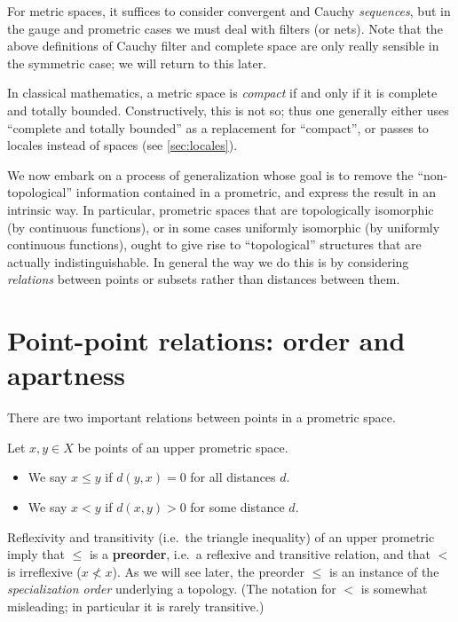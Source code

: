 \documentclass{article}
\begin{document}
For metric spaces, it suffices to consider convergent and Cauchy \emph{sequences}, but in the gauge and prometric cases we must deal with filters (or nets).
Note that the above definitions of Cauchy filter and complete space are only really sensible in the symmetric case; we will return to this later.

In classical mathematics, a metric space is \emph{compact} if and only if it is complete and totally bounded.
Constructively, this is not so; thus one generally either uses ``complete and totally bounded'' as a replacement for ``compact'', or passes to locales instead of spaces (see \cref{sec:locales}).


We now embark on a process of generalization whose goal is to remove the ``non-topological'' information contained in a prometric, and express the result in an intrinsic way.
In particular, prometric spaces that are topologically isomorphic (by continuous functions), or in some cases uniformly isomorphic (by uniformly continuous functions), ought to give rise to ``topological'' structures that are actually indistinguishable.
In general the way we do this is by considering \emph{relations} between points or subsets rather than distances between them.


\section{Point-point relations: order and apartness}
\label{sec:point-point}
\label{sec:order}

There are two important relations between points in a prometric space.

\begin{defn}
  Let $x,y\in X$ be points of an upper prometric space.
  \begin{itemize}
  \item We say $x\le y$ if $d(y,x)=0$ for all distances $d$.
  \item We say $x<y$ if $d(x,y)>0$ for some distance $d$.
  \end{itemize}
\end{defn}

Reflexivity and transitivity (i.e.\ the triangle inequality) of an upper prometric imply that $\le$ is a \textbf{preorder}, i.e.\ a reflexive and transitive relation, and that $<$ is irreflexive ($x\not<x$).
As we will see later, the preorder $\le$ is an instance of the \emph{specialization order} underlying a topology.
(The notation for $<$ is somewhat misleading; in particular it is rarely transitive.)
\end{document}
